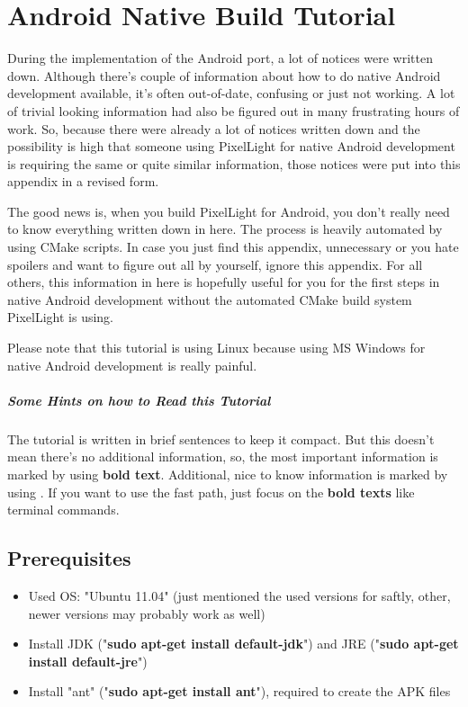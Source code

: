 \chapter{Android Native Build Tutorial}
During the implementation of the Android port, a lot of notices were written down. Although there's couple of information about how to do native Android development available, it's often out-of-date, confusing or just not working. A lot of trivial looking information had also be figured out in many frustrating hours of work. So, because there were already a lot of notices written down and the possibility is high that someone using PixelLight for native Android development is requiring the same or quite similar information, those notices were put into this appendix in a revised form.

The good news is, when you build PixelLight for Android, you don't really need to know everything written down in here. The process is heavily automated by using CMake scripts. In case you just find this appendix, unnecessary or you hate spoilers and want to figure out all by yourself, ignore this appendix. For all others, this information in here is hopefully useful for you for the first steps in native Android development without the automated CMake build system PixelLight is using.

Please note that this tutorial is using Linux because using MS Windows for native Android development is really painful.


\paragraph{Some Hints on how to Read this Tutorial}
The tutorial is written in brief sentences to keep it compact. But this doesn't mean there's no additional information, so, the most important information is marked by using \textbf{bold text}. Additional, nice to know information is marked by using \textrightarrow. If you want to use the fast path, just focus on the \textbf{bold texts} like terminal commands.




\section{Prerequisites}
\begin{itemize}
\item{Used \ac{OS}: "Ubuntu 11.04" (just mentioned the used versions for saftly, other, newer versions may probably work as well)}
\item{Install \ac{JDK} ("\textbf{sudo apt-get install default-jdk}") and \ac{JRE} ("\textbf{sudo apt-get install default-jre}")}
\item{Install "ant" ("\textbf{sudo apt-get install ant}"), required to create the \ac{APK} files}
\end{itemize}



